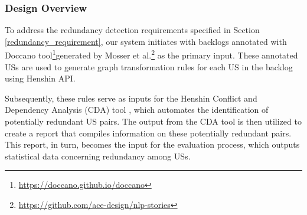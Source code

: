 \subsubsection*{Design Overview}
To address the redundancy detection requirements specified in Section \ref{redundancy_requirement}, our system initiates with backlogs annotated with Doccano tool\footnote{\href{https://doccano.github.io/doccano}{https://doccano.github.io/doccano}}generated by Mosser et al.\footnote{\href{https://github.com/ace-design/nlp-stories}{https://github.com/ace-design/nlp-stories}} as the primary input\cite{arulmohan2023extracting}. These annotated USs are used to generate graph transformation rules for each US in the backlog using Henshin API.

Subsequently, these rules serve as inputs for the Henshin Conflict and Dependency Analysis (CDA) tool \cite{mens2007analysing}, which automates the identification of potentially redundant US pairs. The output from the CDA tool is then utilized to create a report that compiles information on these potentially redundant pairs. This report, in turn, becomes the input for the evaluation process, which outputs statistical data concerning redundancy among USs.

